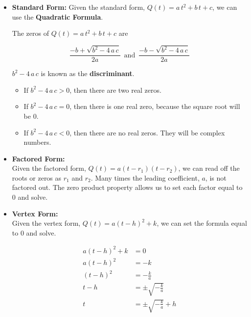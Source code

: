\documentclass{ximera}
\begin{document}
\begin{itemize}

\item \textbf{\textcolor{purple!85!blue}{Standard Form:}}  Given the standard form, $Q(t) = a \, t^2 + b \, t + c$, we can use the \textbf{Quadratic Formula}.

The zeros of $Q(t) = a \, t^2 + b \, t + c$ are

\[   \frac{-b + \sqrt{b^2 - 4 \, a \, c}}{2a}      \, \text{ and } \,       \frac{-b - \sqrt{b^2 - 4 \, a \, c}}{2a}    \]



$b^2 - 4 \, a \, c$ is known as the \textbf{discriminant}. 




\begin{itemize}
\item If $b^2 - 4 \, a \, c > 0$, then there are two real zeros.
\item If $b^2 - 4 \, a \, c = 0$, then there is one real zero, because the square root will be $0$.
\item If $b^2 - 4 \, a \, c < 0$, then there are no real zeros.  They will be complex numbers.
\end{itemize}





\item \textbf{\textcolor{purple!85!blue}{Factored Form:}} \\ 
Given the factored form, $Q(t) = a (t - r_1)(t - r_2)$, we can read off the roots or zeros as $r_1$ and $r_2$. Many times the leading coefficient, $a$, is not factored out.  The zero product property allows us to set each factor equal to $0$ and solve.






\item  \textbf{\textcolor{purple!85!blue}{Vertex Form:}} \\
Given the vertex form, $Q(t) = a (t - h)^2 + k$, we can set the formula equal to $0$ and solve.



\begin{align*}
a (t - h)^2 + k    & = 0  \\
a (t - h)^2        & = -k  \\
(t - h)^2        & = -\frac{k}{a}  \\
t - h        & = \pm \sqrt{-\frac{k}{a}}  \\
t        & = \pm \sqrt{-\frac{k}{a}}  + h
\end{align*}


\end{itemize}
\end{document}
